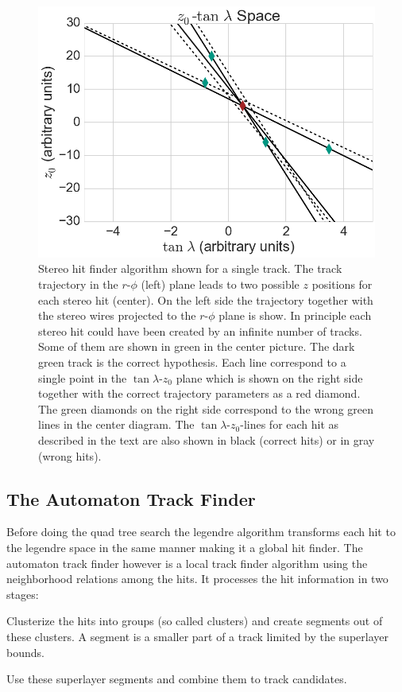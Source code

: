 \begin{figure}
 \vspace*{1cm}
 \includegraphics[scale=0.3]{figures/theory/stereo_3.png}
 \caption[Stereo legendre algorithm.]{Stereo hit finder algorithm shown for a single track. The track trajectory in the $r$-$\phi$ (left) plane leads to two possible $z$ positions for each stereo hit (center). On the left side the trajectory together with the stereo wires projected to the $r$-$\phi$ plane is show. In principle each stereo hit could have been created by an infinite number of tracks. Some of them are shown in green in the center picture. The dark green track is the correct hypothesis. Each line correspond to a single point in the $\tan \lambda$-$z_0$ plane which is shown on the right side together with the correct trajectory parameters as a red diamond. The green diamonds on the right side correspond to the wrong green lines in the center diagram. The $\tan \lambda$-$z_0$-lines for each hit as described in the text are also shown in black (correct hits) or in gray (wrong hits).}
 \label{fig-stereo-explained}
\end{figure}


\subsection{The Automaton Track Finder}
Before doing the quad tree search the legendre algorithm transforms each hit to the legendre space in the same manner making it a global hit finder. The automaton track finder however is a local track finder algorithm using the neighborhood relations among the hits. It processes the hit information in two stages:
\begin{zlist}
  \item Clusterize the hits into groups (so called clusters) and create segments out of these clusters. A segment is a smaller part of a track limited by the superlayer bounds. 
  \item Use these superlayer segments and combine them to track candidates.
\end{zlist}

